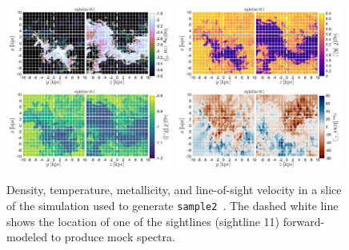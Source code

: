 \documentclass[fleqn,usenatbib]{mnras}
\begin{document}
\begin{figure}
    \centering
    \includegraphics[width=0.49\textwidth]{figures/sample2/projections/density_projection_maps_SL_11.jpg}
    \includegraphics[width=0.49\textwidth]{figures/sample2/projections/temperature_projection_maps_SL_11.jpg} \\
    \includegraphics[width=0.49\textwidth]{figures/sample2/projections/metallicity_projection_maps_SL_11.jpg}
    \includegraphics[width=0.49\textwidth]{figures/sample2/projections/velocity_projection_maps_SL_11.jpg}
    \caption{
    Density, temperature, metallicity, and line-of-sight velocity in a slice of the simulation used to generate \texttt{sample2}~\citep{mandelker2020Instability}.
    The dashed white line shows the location of one of the sightlines (sightline 11) forward-modeled to produce mock spectra.
    }
    \label{f: sample2 ray 11}
\end{figure}
\end{document}

